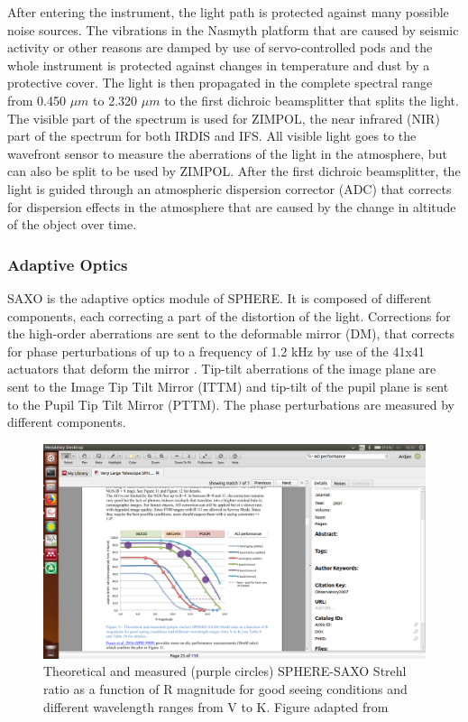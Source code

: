 \documentclass[twoside,single,12pt]{lion-msc}
\begin{document}
After entering the instrument, the light path is protected against many possible noise sources. The vibrations in the Nasmyth platform that are caused by seismic activity or other reasons are damped by use of servo-controlled pods and the whole instrument is protected against changes in temperature and dust by a protective cover. The light is then propagated in the complete spectral range from 0.450 $\mu m$ to 2.320 $\mu m$ to the first dichroic beamsplitter that splits the light. The visible part of the spectrum is used for ZIMPOL, the near infrared (NIR) part of the spectrum for both IRDIS and IFS. All visible light goes to the wavefront sensor to measure the aberrations of the light in the atmosphere, but can also be split to be used by ZIMPOL. After the first dichroic beamsplitter, the light is guided through an atmospheric dispersion corrector (ADC) that corrects for dispersion effects in the atmosphere that are caused by the change in altitude of the object over time.
\bigskip

\subsubsection{Adaptive Optics}
SAXO is the adaptive optics module of SPHERE. It is composed of different components, each correcting a part of the distortion of the light. Corrections for the high-order aberrations are sent to the deformable mirror (DM), that corrects for phase perturbations of up to a frequency of 1.2 kHz by use of the 41x41 actuators that deform the mirror \citep{Hugot2012}. Tip-tilt aberrations of the image plane are sent to the Image Tip Tilt Mirror (ITTM) and tip-tilt of the pupil plane is sent to the Pupil Tip Tilt Mirror (PTTM). The phase perturbations are measured by different components.
\bigskip

\begin{figure}[htbp]
\centering
\vspace{-5mm}
\hspace{-7mm}\includegraphics[trim={8cm 4.5cm 19cm 10cm},clip,width = 1.05\textwidth]{aoperformance}
\caption{Theoretical and measured (purple circles) SPHERE-SAXO Strehl ratio as a function of R magnitude for good seeing conditions and different wavelength ranges from V to K. Figure adapted from \citep{Fusco2014}}
\label{fig:aoperformance}
\end{figure}
\end{document}
